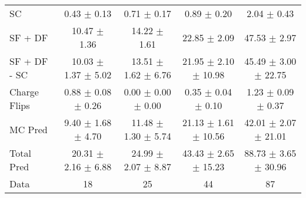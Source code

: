\begin{tabular}{l|cccc}
                                 SC &  0.43 $\pm$  0.13 &  0.71 $\pm$  0.17 &  0.89 $\pm$  0.20 &  2.04 $\pm$  0.43 \\
                            SF + DF & 10.47 $\pm$  1.36 & 14.22 $\pm$  1.61 & 22.85 $\pm$  2.09 & 47.53 $\pm$  2.97 \\
\hline
                       SF + DF - SC & 10.03 $\pm$  1.37 $\pm$  5.02 & 13.51 $\pm$  1.62 $\pm$  6.76 & 21.95 $\pm$  2.10 $\pm$ 10.98 & 45.49 $\pm$  3.00 $\pm$ 22.75 \\
\hline\hline
                       Charge Flips &  0.88 $\pm$  0.08 $\pm$  0.26 &  0.00 $\pm$  0.00 $\pm$  0.00 &  0.35 $\pm$  0.04 $\pm$  0.10 &  1.23 $\pm$  0.09 $\pm$  0.37 \\
\hline
                            MC Pred &  9.40 $\pm$  1.68 $\pm$  4.70 & 11.48 $\pm$  1.30 $\pm$  5.74 & 21.13 $\pm$  1.61 $\pm$ 10.56 & 42.01 $\pm$  2.07 $\pm$ 21.01 \\
\hline
                         Total Pred & 20.31 $\pm$  2.16 $\pm$  6.88 & 24.99 $\pm$  2.07 $\pm$  8.87 & 43.43 $\pm$  2.65 $\pm$ 15.23 & 88.73 $\pm$  3.65 $\pm$ 30.96 \\
\hline\hline
                               Data &    18 &    25 &    44 &    87 \\
\hline\hline
\end{tabular}

